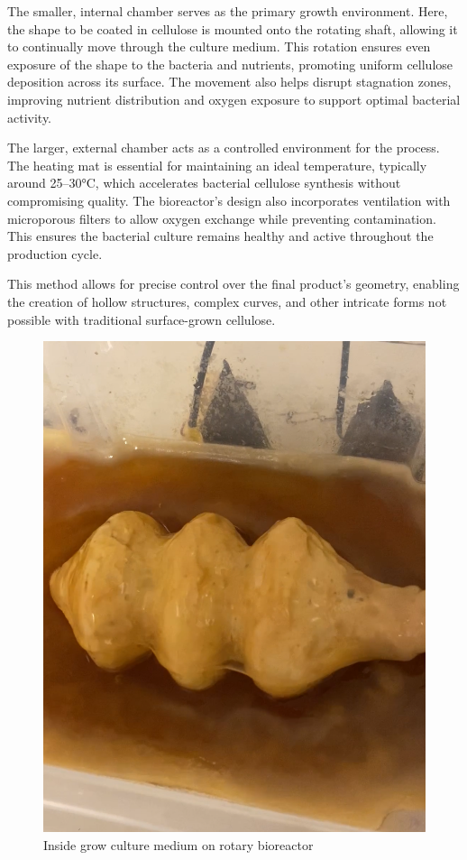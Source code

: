 The smaller, internal chamber serves as the primary growth environment. Here, the shape to be coated in cellulose is mounted onto the rotating shaft, allowing it to continually move through the culture medium. This rotation ensures even exposure of the shape to the bacteria and nutrients, promoting uniform cellulose deposition across its surface. The movement also helps disrupt stagnation zones, improving nutrient distribution and oxygen exposure to support optimal bacterial activity.

The larger, external chamber acts as a controlled environment for the process. The heating mat is essential for maintaining an ideal temperature, typically around 25–30°C, which accelerates bacterial cellulose synthesis without compromising quality. The bioreactor's design also incorporates ventilation with microporous filters to allow oxygen exchange while preventing contamination. This ensures the bacterial culture remains healthy and active throughout the production cycle.

This method allows for precise control over the final product's geometry, enabling the creation of hollow structures, complex curves, and other intricate forms not possible with traditional surface-grown cellulose. 
\begin{figure}[h]
    \centering
    \includegraphics{images/insiderotary.png}
    \caption{Inside grow culture medium on rotary bioreactor}
    \label{fig:rotary inside}
\end{figure} 

